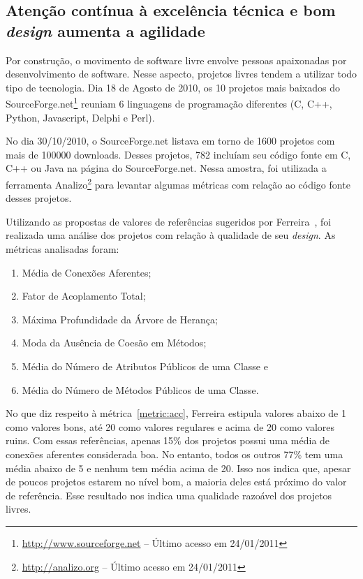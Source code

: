 \subsection[Excelência técnica]{Atenção contínua à excelência técnica
  e bom \textit{design} aumenta a agilidade}

Por construção, o movimento de software livre envolve pessoas
apaixonadas por desenvolvimento de software. Nesse aspecto, projetos
livres tendem a utilizar todo tipo de tecnologia.  Dia 18 de Agosto de
2010, os 10 projetos mais baixados do
SourceForge.net\footnote{\url{http://www.sourceforge.net} -- Último
  acesso em 24/01/2011} reuniam 6 linguagens de programação diferentes
(C, C++, Python, Javascript, Delphi e Perl).

No dia 30/10/2010, o SourceForge.net listava em torno de 1600 projetos
com mais de 100000 downloads. Desses projetos, 782 incluíam seu código
fonte em C, C++ ou Java na página do SourceForge.net.  Nessa amostra,
foi utilizada a ferramenta Analizo\footnote{\url{http://analizo.org}
  -- Último acesso em 24/01/2011} \cite{Terceiro2010} para levantar
algumas métricas com relação ao código fonte desses projetos.


Utilizando as propostas de valores de referências sugeridos por
Ferreira~\cite{Ferreira2009}, foi realizada uma análise dos projetos
com relação à qualidade de seu \textit{design}. As métricas analisadas
foram:
\begin{enumerate}
\item Média de Conexões Aferentes;
  \label{metric:acc}
\item Fator de Acoplamento Total;
  \label{metric:cof}
\item Máxima Profundidade da Árvore de Herança;
  \label{metric:dti}
\item Moda da Ausência de Coesão em Métodos;
  \label{metric:lcom}
\item Média do Número de Atributos Públicos de uma Classe e
  \label{metric:npa}
\item Média do Número de Métodos Públicos de uma Classe.
  \label{metric:npm}
\end{enumerate}

No que diz respeito à métrica~\ref{metric:acc}, Ferreira estipula
valores abaixo de 1 como valores bons, até 20 como valores regulares e
acima de 20 como valores ruins. Com essas referências, apenas 15\% dos
projetos possui uma média de conexões aferentes considerada boa. No
entanto, todos os outros 77\% tem uma média abaixo de 5 e nenhum tem
média acima de 20. Isso nos indica que, apesar de poucos projetos
estarem no nível bom, a maioria deles está próximo do valor de
referência. Esse resultado nos indica uma qualidade razoável dos
projetos livres.

